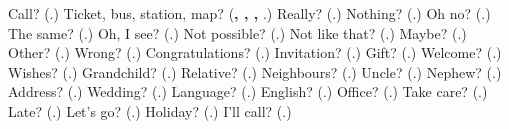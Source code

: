 \begin{tcolorbox}[breakable,colback=teal!4,colframe=teal!35!black,title={Before you move on}]
Call? (\textbf{}.) Ticket, bus, station, map? (\textbf{, , , }.) Really? (\textbf{}.) Nothing? (\textbf{}.) Oh no? (\textbf{}.) The same? (\textbf{}.) Oh, I see? (\textbf{}.) Not possible? (\textbf{}.) Not like that? (\textbf{}.) Maybe? (\textbf{}.) Other? (\textbf{}.) Wrong? (\textbf{}.) Congratulations? (\textbf{}.) Invitation? (\textbf{}.) Gift? (\textbf{}.) Welcome? (\textbf{}.) Wishes? (\textbf{}.) Grandchild? (\textbf{}.) Relative? (\textbf{}.) Neighbours? (\textbf{}.) Uncle? (\textbf{}.) Nephew? (\textbf{}.) Address? (\textbf{}.) Wedding? (\textbf{}.) Language? (\textbf{}.) English? (\textbf{}.) Office? (\textbf{}.) Take care? (\textbf{}.) Late? (\textbf{}.) Let's go? (\textbf{}.) Holiday? (\textbf{}.) I'll call? (\textbf{}.)
\end{tcolorbox}
